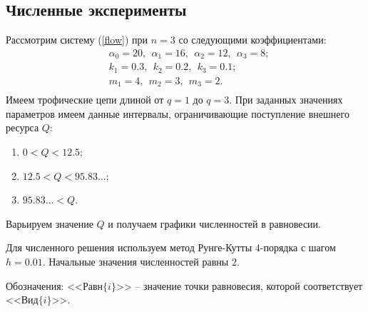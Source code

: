 \subsection{Численные эксперименты}
Рассмотрим систему (\ref{flow}) при \(n=3\) со следующими коэффициентами:
\begin{equation} \label{flow_exp1}
    \begin{split}
        & \alpha_0 = 20, ~~ \alpha_1 = 16, ~~ \alpha_2 = 12, ~~ \alpha_3 = 8; \\
        & k_1 = 0.3, ~~ k_2 = 0.2, ~~ k_3 = 0.1; \\
        & m_1 = 4, ~~ m_2 = 3, ~~ m_3 = 2. \\ 
    \end{split}
\end{equation}
Имеем трофические цепи длиной от \(q=1\) до \(q=3\). При заданных значениях параметров имеем данные интервалы, ограничивающие поступление внешнего ресурса \(Q\):
\begin{enumerate}
    \item \(0 < Q < 12.5\);
    \item \(12.5 < Q < 95.83\ldots\);
    \item \( 95.83\ldots < Q\).
\end{enumerate}
Варьируем значение \(Q\) и получаем графики численностей в равновесии.

Для численного решения используем метод Рунге-Кутты \(4\)-порядка с шагом \(h = 0.01\). Начальные значения численностей равны \(2\).

Обозначения: <<Равн\(\{i\}\)>> -- значение точки равновесия, которой соответствует <<Вид\(\{i\}\)>>.

